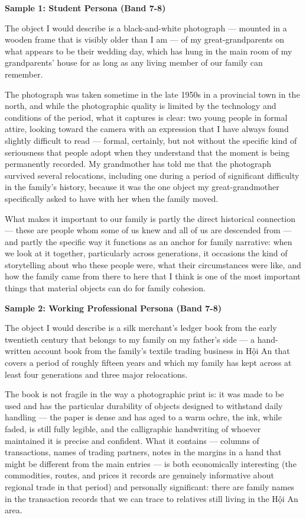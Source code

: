 \begin{ieltsanswer}
\textbf{Sample 1: Student Persona (Band 7-8)}

The object I would describe is a black-and-white photograph — mounted in a wooden frame that is visibly older than I am — of my great-grandparents on what appears to be their wedding day, which has hung in the main room of my grandparents' house for as long as any living member of our family can remember.

The photograph was taken sometime in the late 1950s in a provincial town in the north, and while the photographic quality is limited by the technology and conditions of the period, what it captures is clear: two young people in formal attire, looking toward the camera with an expression that I have always found slightly difficult to read — formal, certainly, but not without the specific kind of seriousness that people adopt when they understand that the moment is being permanently recorded. My grandmother has told me that the photograph survived several relocations, including one during a period of significant difficulty in the family's history, because it was the one object my great-grandmother specifically asked to have with her when the family moved.

What makes it important to our family is partly the direct historical connection — these are people whom some of us knew and all of us are descended from — and partly the specific way it functions as an anchor for family narrative: when we look at it together, particularly across generations, it occasions the kind of storytelling about who these people were, what their circumstances were like, and how the family came from there to here that I think is one of the most important things that material objects can do for family cohesion.

\textbf{Sample 2: Working Professional Persona (Band 7-8)}

The object I would describe is a silk merchant's ledger book from the early twentieth century that belongs to my family on my father's side — a hand-written account book from the family's textile trading business in Hội An that covers a period of roughly fifteen years and which my family has kept across at least four generations and three major relocations.

The book is not fragile in the way a photographic print is: it was made to be used and has the particular durability of objects designed to withstand daily handling — the paper is dense and has aged to a warm ochre, the ink, while faded, is still fully legible, and the calligraphic handwriting of whoever maintained it is precise and confident. What it contains — columns of transactions, names of trading partners, notes in the margins in a hand that might be different from the main entries — is both economically interesting (the commodities, routes, and prices it records are genuinely informative about regional trade in that period) and personally significant: there are family names in the transaction records that we can trace to relatives still living in the Hội An area.


\end{ieltsanswer}
